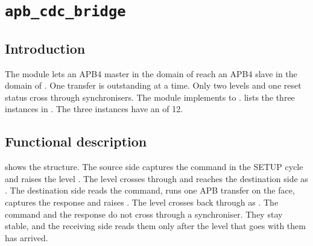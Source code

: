 \section{\texttt{apb\_cdc\_bridge}}\label{tm:mod:apb-cdc-bridge}

\subsection{Introduction}
The module  lets an APB4 master in the domain of  reach an APB4 slave in the domain of . One transfer is outstanding at a time. Only two levels and one reset status cross through synchronisers. The module implements  to .  lists the three instances in . The three instances have an  of 12.

\subsection{Functional description}
 shows the structure. The source side captures the command in the SETUP cycle and raises the level . The level crosses through  and reaches the destination side as . The destination side reads the command, runs one APB transfer on the  face, captures the response and raises . The level crosses back through  as . The command and the response do not cross through a synchroniser. They stay stable, and the receiving side reads them only after the level that goes with them has arrived.


